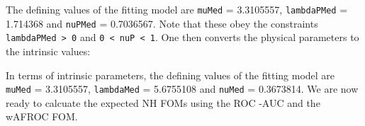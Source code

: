 \documentclass[
]{book}
\newenvironment{Shaded}{\begin{snugshade}}{\end{snugshade}}
\newcommand{\DataTypeTok}[1]{\textcolor[rgb]{0.13,0.29,0.53}{#1}}
\newcommand{\KeywordTok}[1]{\textcolor[rgb]{0.13,0.29,0.53}{\textbf{#1}}}
\newcommand{\NormalTok}[1]{#1}
\newcommand{\OperatorTok}[1]{\textcolor[rgb]{0.81,0.36,0.00}{\textbf{#1}}}
\newcommand{\StringTok}[1]{\textcolor[rgb]{0.31,0.60,0.02}{#1}}
\begin{document}
The defining values of the fitting model are \texttt{muMed} = 3.3105557, \texttt{lambdaPMed} = 1.714368 and \texttt{nuPMed} = 0.7036567. Note that these obey the constraints \texttt{lambdaPMed\ \textgreater{}\ 0} and \texttt{0\ \textless{}\ nuP\ \textless{}\ 1}. One then converts the physical parameters to the intrinsic values:

\begin{Shaded}
\end{Shaded}

In terms of intrinsic parameters, the defining values of the fitting model are \texttt{muMed} = 3.3105557, \texttt{lambdaMed} = 5.6755108 and \texttt{nuMed} = 0.3673814. We are now ready to calcuate the expected NH FOMs using the ROC -AUC and the wAFROC FOM.

\begin{Shaded}
\end{Shaded}
\end{document}
